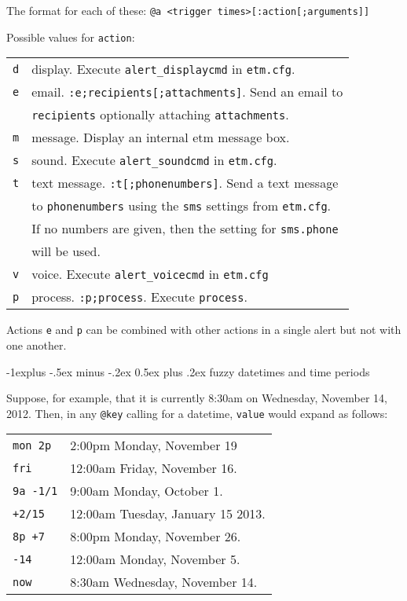 \documentclass[9pt,landscape]{article}
\makeatletter
\renewcommand{\subsection}{\@startsection{subsection}{2}{0mm}%
                                {-1explus -.5ex minus -.2ex}%
                                {0.5ex plus .2ex}%
                                {\normalfont\normalsize\bfseries}}
\makeatother
\begin{document}
\begin{multicols}{3}
The format for each of these:
\vskip 3pt
\texttt{@a <trigger times>[:action[;arguments]]}
\vskip 3pt

Possible values for \verb!action!:
\vskip 3pt

\begin{tabular}{@{}ll@{}}
\texttt{d} & display. Execute \verb!alert_displaycmd! in \verb!etm.cfg!. \\
\texttt{e} & email. \verb!:e;recipients[;attachments]!. Send an email to \\
           & \verb!recipients! optionally attaching \verb!attachments!.\\
\texttt{m} & message. Display an internal etm message box. \\
\texttt{s} & sound. Execute \verb!alert_soundcmd! in \verb!etm.cfg!. \\
\texttt{t} & text message. \verb!:t[;phonenumbers]!. Send a text message \\
           & to \verb'phonenumbers' using the \verb'sms' settings from \verb'etm.cfg'. \\
           & If no numbers are given, then the setting for \verb'sms.phone' \\
           & will be used. \\
\texttt{v} & voice. Execute \verb!alert_voicecmd! in \verb!etm.cfg! \\
\texttt{p} & process. \verb!:p;process!. Execute \verb!process!.  \\
\end{tabular}

\vskip 3pt

Actions \verb!e! and \verb!p! can be combined with other actions in a single alert but not with one another.


\subsection{fuzzy datetimes and time periods}

Suppose, for example, that it is currently 8:30am on Wednesday, November 14, 2012. Then, in any \verb!@key! calling for a datetime, \verb!value! would expand as follows:
\vskip 3pt

\begin{tabular}{@{}ll@{}}
\texttt{mon 2p} & 2:00pm Monday, November 19 \\
\texttt{fri} & 12:00am Friday, November 16. \\
\texttt{9a -1/1} & 9:00am Monday, October 1. \\
\texttt{+2/15} & 12:00am Tuesday, January 15 2013. \\
\texttt{8p +7} & 8:00pm Monday, November 26.\\
\texttt{-14} & 12:00am Monday, November 5. \\
\texttt{now} & 8:30am Wednesday, November 14. \\
\end{tabular}


\end{multicols}
\end{document}

